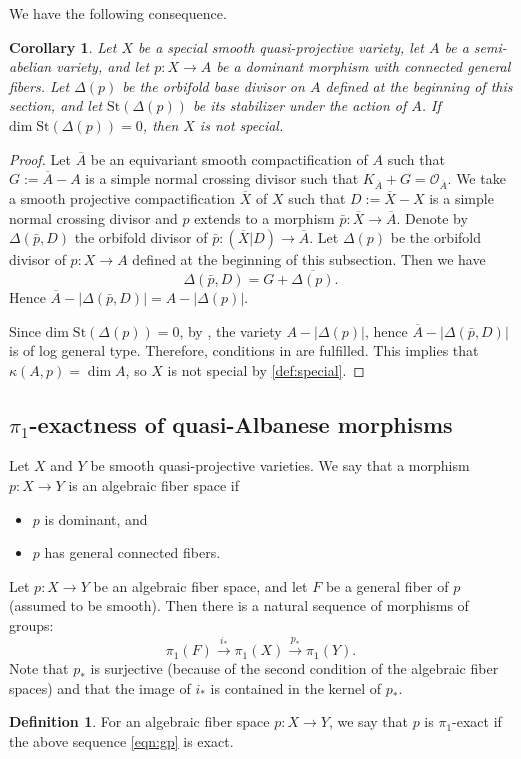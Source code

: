 \documentclass[11pt,english]{smfart}
\theoremstyle{plain}
\newtheorem{cor}[thm]{Corollary}
\theoremstyle{definition}
\newtheorem{dfn}[thm]{Definition}
\theoremstyle{remark}
\numberwithin{equation}{subsection}
\theoremstyle{plain}
\newcommand{\cO}{\mathcal O}
\begin{document}
 We have the following consequence. 
\begin{cor} \label{cor:specialalg}
	Let \(X\) be a special smooth quasi-projective variety, let \(A\) be a semi-abelian variety, and let \(p : X \to A\) be a dominant morphism with connected general fibers. Let \(\Delta(p)\) be the orbifold base divisor on \(A\) defined at the beginning of this section, and let \(\mathrm{St}(\Delta(p))\) be its stabilizer under the action of \(A\). If \(\mathrm{dim}\; \mathrm{St}(\Delta(p)) = 0\), then \(X\) is not special. 
\end{cor}
\begin{proof}
	Let $\overline{A}$  be an equivariant smooth compactification of $A$ such that $G:=\overline{A}-A$ is a simple normal crossing divisor such that $K_{\overline{A}}+G=\cO_{\overline{A}}$. We take a smooth projective compactification $\overline{X}$ of $X$   such that $D:=\overline{X}-X$ is a simple normal crossing divisor and $p$ extends to a morphism $\bar{p}:\overline{X}\to \overline{A}$.   Denote by $\Delta(\bar{p},D)$ the orbifold divisor of $\bar{p}:(\overline{X}|D)\to \overline{A}$.   Let $\Delta(p)$ be the orbifold divisor of $p:X\to A$ defined at the beginning of this subsection. Then we have
	$$
	\Delta(\bar{p},D) =G+\overline{\Delta(p)}.
	$$
Hence $\overline{A}-|\Delta(\bar{p},D)|=A-|\Delta(p)|$.
	
Since \(\mathrm{dim}\; \mathrm{St}(\Delta(p)) = 0\),	by \cite[Proposition 5.6.21]{NW13}, the variety $A-|\Delta(p)|$, hence  $\overline{A}-|\Delta(\bar{p},D)|$ is of log general type.  Therefore,  conditions in   are fulfilled. This implies that \(\kappa( {A},  {p}) = \dim A\), so \(X\) is not special by \cref{def:special}.
\end{proof}

\subsection{$\pi_1$-exactness of quasi-Albanese morphisms}\label{s2}
Let $X$ and $Y$ be smooth quasi-projective varieties. 
We say that a morphism $p:X\to Y$ is an algebraic fiber space 
if 
\begin{itemize}
\item
$p$ is dominant, and
\item
$p$ has general connected fibers. 
\end{itemize}




Let $p:X\to Y$ be an algebraic fiber space, and let $F$ be a general fiber of $p$ (assumed to be smooth). Then there is a natural sequence of morphisms of groups:
\begin{equation}\label{eqn:gp}
\pi _1(F)\overset{i_*}{\to}\pi _1(X)\overset{p_*}{\to} \pi _1(Y).
\end{equation}
Note that $p_*$ is surjective (because of the second condition of the algebraic fiber spaces) and that the image of $i_*$ is contained in the kernel of $p_*$.
\begin{dfn}
For an algebraic fiber space $p:X\to Y$, we say that $p$ is $\pi _1$-exact if the above sequence \eqref{eqn:gp} is exact.
\end{dfn}
\end{document}
